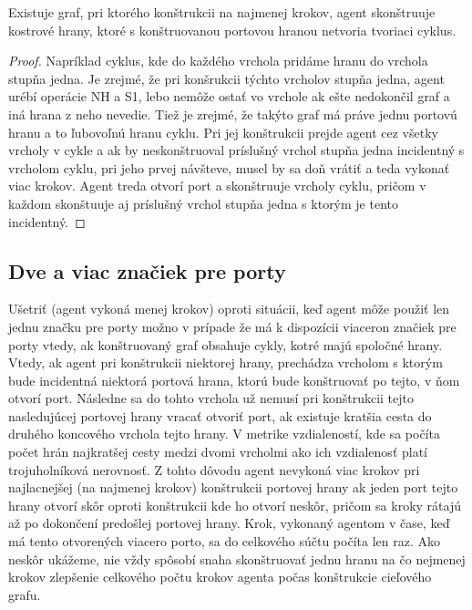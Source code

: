 \begin{lem}
Existuje graf, pri ktorého konštrukcii na najmenej krokov, agent
skonštruuje kostrové hrany, ktoré s konštruovanou portovou hranou netvoria
tvoriaci cyklus.
\end{lem}
\begin{proof}
Napríklad cyklus, kde do každého vrchola pridáme hranu do vrchola stupňa
jedna. Je zrejmé, že pri konšrukcii týchto vrcholov stupňa jedna, agent
urébí operácie NH a S1, lebo nemôže ostať vo vrchole ak ešte nedokončil graf
a iná hrana z neho nevedie. Tiež je zrejmé, že takýto graf má práve jednu
portovú hranu a to ľubovoľnú hranu cyklu. Pri jej konštrukcii prejde agent
cez všetky vrcholy v cykle a ak by neskonštruoval príslušný vrchol stupňa
jedna incidentný s vrcholom cyklu, pri jeho prvej návšteve, musel by sa doň
vrátiť a teda vykonať viac krokov. Agent treda otvorí port a skonštruuje
vrcholy cyklu, pričom v každom skonštuuje aj príslušný vrchol stupňa jedna s
ktorým je tento incidentný.
\end{proof}


\subsection{Dve a viac značiek pre porty}
Ušetriť (agent vykoná menej krokov) oproti situácii, 
keď agent môže použiť len jednu značku pre porty
možno v prípade že má k dispozícii viaceron značiek pre porty vtedy,
 ak konštruovaný graf obsahuje cykly, kotré majú spoločné hrany.
Vtedy, ak agent pri konštrukcii niektorej hrany, 
prechádza vrcholom s ktorým bude incidentná niektorá
portová
hrana, ktorú bude konštruovať po tejto,
 v ňom otvorí port. Následne sa do tohto vrchola už nemusí pri konštrukcii
tejto nasledujúcej portovej hrany vracať otvoriť port, ak existuje
kratšia cesta do druhého koncového vrchola tejto hrany. V metrike
vzdialeností, kde sa počíta počet hrán najkratšej cesty medzi dvomi vrcholmi
ako ich vzdialenosť platí trojuholníková nerovnosť. Z tohto dôvodu agent
nevykoná viac krokov pri najlacnejšej (na najmenej krokov) 
konštrukcii portovej hrany ak jeden port tejto hrany otvorí skôr oproti
konštrukcii kde ho otvorí neskôr, pričom sa kroky rátajú až po dokončení
predošlej portovej hrany. Krok, vykonaný agentom v čase, keď má tento
otvorených viacero porto, sa do celkového súčtu počíta len raz.
Ako neskôr ukážeme, nie vždy spôsobí snaha skonštruovať jednu hranu na čo
nejmenej krokov zlepšenie celkového počtu krokov agenta počas konštrukcie
cieľového grafu.

